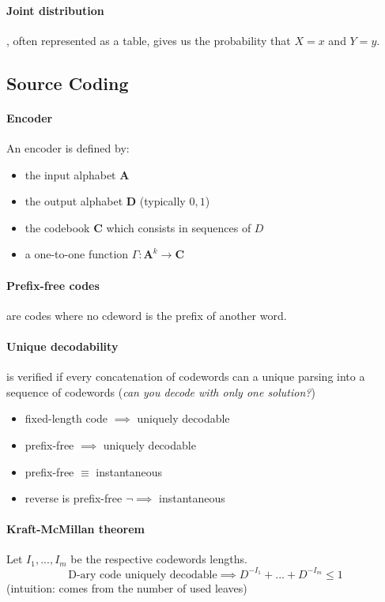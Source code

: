 \documentclass{article}
\begin{document}
\paragraph{Joint distribution}, often represented as a table, gives us the probability that $ X = x $ and $ Y = y $.

\subsection{Source Coding}

\paragraph{Encoder} An encoder is defined by:
\begin{itemize}
    \item the input alphabet $ \mathbf{A} $
    \item the output alphabet $ \mathbf{D} $ (typically $ {0,1} $)
    \item the codebook $ \mathbf{C} $ which consists in sequences of $ D $
    \item a one-to-one function $ \Gamma : \mathbf{A}^k \to \mathbf{C} $
\end{itemize}

\paragraph{Prefix-free codes} are codes where no cdeword is the prefix of another word.

\paragraph{Unique decodability} is verified if every concatenation of codewords can a unique parsing into a sequence of codewords (\textit{can you decode with only one solution?})

\begin{itemize}
    \item fixed-length code $ \implies $ uniquely decodable
    \item prefix-free $ \implies $ uniquely decodable
    \item prefix-free $ \equiv $ instantaneous
    \item reverse is prefix-free $ \neg \implies $ instantaneous
\end{itemize}

\paragraph{Kraft-McMillan theorem} Let $ I_1, ..., I_m $ be the respective codewords lengths.\\
\[ \text{D-ary code uniquely decodable} \implies D^{-I_1} + ... + D^{-I_m} \leq 1 \]
(intuition: comes from the number of used leaves)
\end{document}
